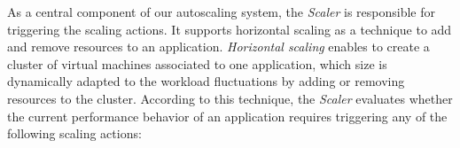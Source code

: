 




As a central component of our autoscaling system, the \emph{Scaler} is responsible for triggering the scaling actions. It supports horizontal scaling as a technique to add and remove resources to an application. \emph{Horizontal scaling} enables to create a cluster of virtual machines associated to one application, which size is dynamically adapted to the workload fluctuations by adding or removing resources to the cluster. According to this technique, the \emph{Scaler} evaluates whether the current performance behavior of an application requires triggering any of the following scaling actions: 

